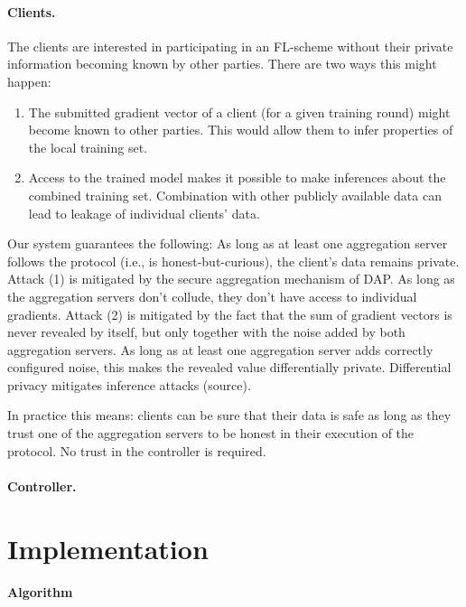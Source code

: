 \documentclass{article}
\begin{document}
\paragraph{Clients.} The clients are interested in participating in an FL-scheme
without their private information becoming known by other parties. There are two
ways this might happen:
\begin{enumerate}[itemsep=0]
\item The submitted gradient vector of a client (for a given training round) might
  become known to other parties. This would allow them to infer properties of
  the local training set.
\item Access to the trained model makes it possible to make inferences about the
  combined training set. Combination with other publicly available data can lead to
  leakage of individual clients' data.
\end{enumerate}
Our system guarantees the following: As long as at least one aggregation server
follows the protocol (i.e., is honest-but-curious), the client's data remains
private. Attack (1) is mitigated by the secure aggregation mechanism of DAP.
As long as the aggregation servers don't collude, they don't have access to
individual gradients. Attack (2) is mitigated by the fact that the sum of
gradient vectors is never revealed by itself, but only together with the noise added by
both aggregation servers. As long as at least one aggregation server adds
correctly configured noise, this makes the revealed value differentially
private. Differential privacy mitigates inference attacks (source).

In practice this means: clients can be sure that their data is safe as long as
they trust one of the aggregation servers to be honest in their execution of the
protocol. No trust in the controller is required.

\paragraph{Controller.}


\section{Implementation}




\paragraph{Algorithm}
\end{document}

